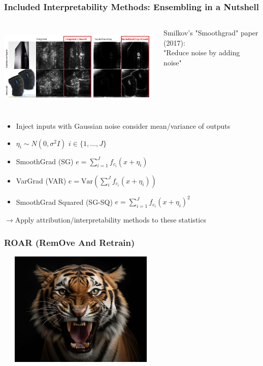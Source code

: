 \documentclass{beamer}
\theoremstyle{mystyle}
\begin{document}
\begin{frame}
    \frametitle{Included Interpretability Methods: Ensembling in a Nutshell}
    \begin{columns}[T] %
        \begin{column}{0.7\textwidth}
            \includegraphics[width=1.0\textwidth, height=4cm]{compareSGBP.png}
        \end{column}
        \begin{column}{0.3\textwidth}
		Smilkov's "Smoothgrad" paper (2017): \\
		"Reduce noise by adding noise"
        \end{column}
    \end{columns}
    \begin{itemize}
        \item Inject inputs with Gaussian noise consider mean/variance of outputs \pause
        \item $\eta_i \sim N(0, \sigma ^2 I)$ $i\in \{1,\ldots, J\} $ \pause
	\item SmoothGrad (SG) $e = \sum_{i=1}^{J} {f_{c_i}( x + \eta_i) }$ \pause
	\item VarGrad (VAR) $e = \text{Var}\left(  \sum_{i}^{J} {f_{c_i}(x + \eta_i)}\right) $ \pause
	\item SmoothGrad Squared (SG-SQ) $e = \sum_{i=1}^{J} {f_{c_i}( x + \eta_i)^{2} }$\pause
    \end{itemize}
$\to$Apply attribution/interpretability methods to these statistics
\end{frame}


\begin{frame}
	\frametitle{ROAR (RemOve And Retrain)}
	\includegraphics[height=5.5cm, width=8cm]{tiger.png}\\
\end{frame}
\end{document}
